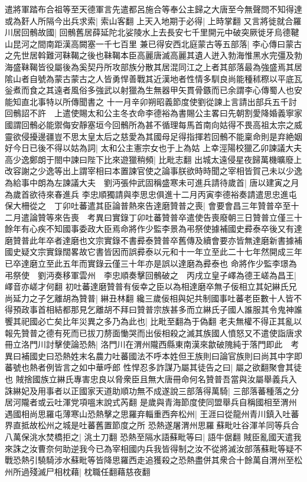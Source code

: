 遣將軍踏布合祖等至天德軍言先遣都呂施合等奉公主歸之大唐至今無聲問不知得達或為姧人所隔今出兵求索|{
	索山客翻}
上天入地期于必得|{
	上時掌翻}
又言將徙就合羅川居回鶻故國|{
	回鶻舊居薛延陀北娑陵水上去長安七千里開元中破突厥徙牙烏德鞬山昆河之間南距漢高闕塞一千七百里}
兼已得安西北庭蒙古等五部落|{
	李心傳曰蒙古之先世居斡難河靺鞨之後也靺鞨本臣高麗唐滅高麗其遺人迸入勃海惟黑水完彊及勃海盛靺鞨皆役屬後為奚契丹所攻部族分散其居混同江之上者其部落最為強盛焉其居隂山者自號為蒙古蒙古之人皆勇悍善戰其近漢地者性情多馴良尚能種秫穄以平底瓦釡煮而食之其遠者風俗多強武以射獵為生無器甲矢貫骨鏃而已余謂李心傳蜀人也安能知直北事特以所傳聞書之}
十一月辛卯朔昭義節度使劉從諫上言請出部兵五千討回鶻詔不許　上遣使賜太和公主冬衣命李德裕為書賜公主畧曰先朝割愛降婚義寧家國謂回鶻必能禦侮安靜塞垣今回鶻所為甚不循理每馬首南向姑得不畏高祖太宗之威靈欲侵擾邊疆豈不思太皇太后之慈愛為其國母足得指揮若回鶻不能稟命則是弃絶姻好今日已後不得以姑為詞|{
	太和公主憲宗女也于上為姑}
上幸涇陽校獵乙卯諫議大夫高少逸鄭朗于閤中諫曰陛下比來遊獵稍頻|{
	比毗志翻}
出城太遠侵星夜歸萬機曠廢上改容謝之少逸等出上謂宰相曰本置諫官使之論事朕欲時時聞之宰相皆賀己未以少逸為給事中朗為左諫議大夫　劉沔張仲武固稱盛寒未可進兵請待歲首|{
	唐以建寅之月為歲首欲待來春進兵}
李忠順獨請與李思忠俱進十二月丙寅李德裕奏請遣思忠進屯保大柵從之　丁卯吐蕃遣其臣論普熱來告達磨贊普之喪|{
	會要會昌三年贊普卒至十二月遣論贊等來告喪　考異曰實錄丁卯吐蕃贊普卒遣使告喪廢朝三日贊普立僅三十餘年有心疾不知國事委政大臣焉命將作少監李景為弔祭使據補國史彛泰卒後又有達磨贊普此年卒者達磨也文宗實錄不書彛泰贊普卒舊傳及續會要亦皆無達磨新書據補國史疑文宗實錄闊畧故它書皆因而誤彛泰以元和十一年立至此二十七年然開成三年已卒達磨立至此五年而實錄云僅三十年亦是誤以達磨為彛泰也}
命將作少監李璟為弔祭使　劉沔奏移軍雲州　李忠順奏擊回鶻破之　丙戌立皇子嶧為德王嵯為昌王|{
	嶧音亦嵯才何翻}
初吐蕃達磨贊普有佞幸之臣以為相達磨卒無子佞相立其妃綝氏兄尚延力之子乞離胡為贊普|{
	綝丑林翻}
纔三歲佞相與妃共制國事吐蕃老臣數十人皆不得預政事首相結都那見乞離胡不拜曰贊普宗族甚多而立綝氏子國人誰服其令鬼神誰饗其祀國必亡矣比年災異之多乃為此也|{
	比毗至翻為于偽翻}
老夫無權不得正其亂以報先贊普之德有死而已拔刀剺面慟哭而出佞相殺之滅其族國人憤怒又不遣使詣唐求冊立洛門川討擊使論恐熱|{
	洛門川在渭州隴西縣東南漢來歙破隗純于落門即此　考異曰補國史曰恐熱姓末名農力吐蕃國法不呼本姓但王族則曰論官族則曰尚其中字即蕃號也熱者例皆言之如中華呼郎}
性悍忍多詐謀乃屬其徒告之曰|{
	屬之欲翻聚會其徒也}
賊捨國族立綝氏專害忠良以脅衆臣且無大唐冊命何名贊普吾當與汝屬舉義兵入誅綝妃及用事者以正國家天道助順功無不成遂說三部落得萬騎|{
	三部落蕃種落之分居河隴者或云吐渾党項嗢末說式芮翻}
是歲與青海節度使同盟舉兵自稱國相至渭州遇國相尚思羅屯薄寒山恐熱擊之思羅弃輜重西奔松州|{
	王涯曰從龍州青川鎮入吐蕃界直抵故松州之城是吐蕃舊置節度之所}
恐熱遂屠渭州思羅蘇毗吐谷渾羊同等兵合八萬保洮水焚橋拒之|{
	洮土刀翻}
恐熱至隔水語蘇毗等曰|{
	語牛倨翻}
賊臣亂國天遣我來誅之汝曹奈何助逆我今已為宰相國内兵我皆得制之汝不從將滅汝部落蘇毗等疑不戰恐熱引驍騎涉水蘇毗等皆降思羅西走追獲殺之恐熱盡併其衆合十餘萬自渭州至松州所過殘滅尸相枕藉|{
	枕職任翻藉慈夜翻}


